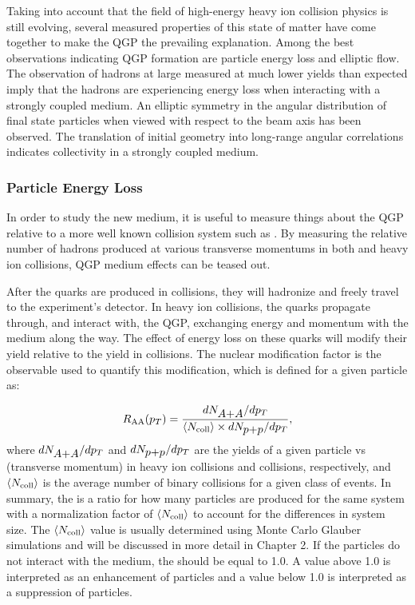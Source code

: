 Taking into account that the field of high-energy heavy ion collision physics is still evolving, several measured properties of this state of matter have come together to make the QGP the prevailing explanation. Among the best observations indicating QGP formation are particle energy loss and elliptic flow. The observation of hadrons at large \pt measured at much lower yields than expected imply that the hadrons are experiencing energy loss when interacting with a strongly coupled medium.  An elliptic symmetry in the angular distribution of final state particles when viewed with respect to the beam axis has been observed. The translation of initial geometry into long-range angular correlations indicates collectivity in a strongly coupled medium.


\subsubsection{Particle Energy Loss}
In order to study the new medium, it is useful to measure things about the QGP relative to a more well known collision system such as \pp. By measuring the relative number of hadrons produced at various transverse momentums in both \pp and heavy ion collisions, QGP medium effects can be teased out.

After the quarks are produced in \pp collisions, they will hadronize and freely travel to the experiment's detector. In heavy ion collisions, the quarks propagate through, and interact
with, the QGP, exchanging energy and momentum with the medium along the way. The effect of energy loss on these quarks will modify their yield relative to the yield in \pp collisions. The nuclear modification factor \raa is the observable used to quantify this modification, which is defined for a given particle as:

\begin{equation}\label{eqn:raa}
 \mbox{$R_{\rm AA}$}(\mbox{$p_T$}) = \frac{dN_{\mbox{$A$+$A$}}/d\mbox{$p_T$}}{\left<\mbox{$N_{\rm coll}$}\right>\times dN_{\mbox{$p$+$p$}}/d\mbox{$p_T$}},
\end{equation}
where $dN_{\mbox{$A$+$A$}}/d\mbox{$p_T$}$ and $dN_{\mbox{$p$+$p$}}/d\mbox{$p_T$}$ are the yields of a given particle vs \pt (transverse momentum) in heavy ion collisions and \pp collisions, respectively, and $\left<\mbox{$N_{\rm coll}$}\right>$ is the average number of binary collisions for a given class of events. In summary, the \raa is a ratio for how many particles are produced for the same system with a normalization factor of $\left<\mbox{$N_{\rm coll}$}\right>$ to account for the differences in system size. The $\left<\mbox{$N_{\rm coll}$}\right>$ value is usually determined using Monte Carlo Glauber simulations and will be discussed in more detail in Chapter 2. If the particles do not interact with the medium, the \raa should be equal to 1.0. A value above 1.0 is interpreted as an enhancement of particles and a value below 1.0 is interpreted as a suppression of particles. 

